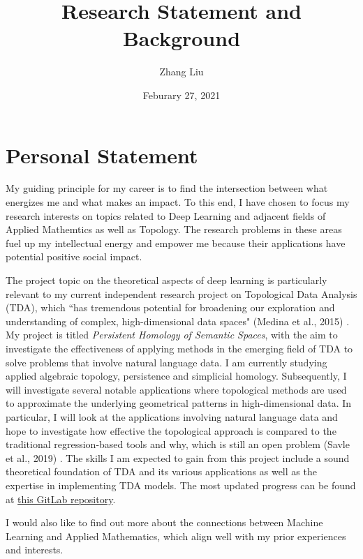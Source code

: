 \documentclass[11pt,reqno,oneside,a4paper]{article}
\title{Research Statement and Background}
\date{Feburary 27, 2021}
\author{Zhang Liu}
\begin{document}
	\maketitle
	\thispagestyle{fancy}
	
	\section{Personal Statement}

	My guiding principle for my career is to find the intersection between what energizes me and what makes an impact. To this end, I have chosen to focus my research interests on topics related to Deep Learning and adjacent fields of Applied Mathemtics as well as Topology. The research problems in these areas fuel up my intellectual energy and empower me because their applications have potential positive social impact.  
	
	 The project topic on the theoretical aspects of deep learning is particularly relevant to my current independent research project on Topological Data Analysis (TDA), which ``has tremendous potential for broadening our exploration and understanding of complex, high-dimensional data spaces" (Medina et al., 2015) \cite{MD2015a}. My project is titled \textit{Persistent Homology of Semantic Spaces}, with the aim to investigate the effectiveness of applying methods in the emerging field of TDA to solve problems that involve natural language data. I am currently studying applied algebraic topology, persistence and simplicial homology. Subsequently, I will investigate several notable applications where topological methods are used to approximate the underlying geometrical patterns in high-dimensional data.  In particular, I will look at the applications involving natural language data and hope to investigate how effective the topological approach is compared to the traditional regression-based tools and why, which is still an open problem (Savle et al., 2019) \cite{Sav2019a}. The skills I am expected to gain from this project include a sound theoretical foundation of TDA and its various applications as well as the expertise in implementing TDA models. The most updated progress can be found at \href{https://gitlab.com/zhang-liu-official/urops-2021-topological-data-analysis}{this GitLab repository}. 
	
	I would also like to find out more about the connections between Machine Learning and Applied Mathematics, which align well with my prior experiences and interests. 
	
\end{document}
